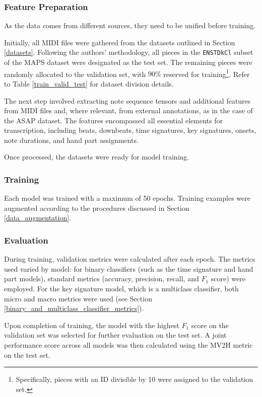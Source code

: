 \subsubsection{Feature Preparation}

As the data comes from different sources, they need to be unified before training.

Initially, all MIDI files were gathered from the datasets outlined in Section \ref{datasets}. Following the authors' methodology, all pieces in the \texttt{ENSTDkCl} subset of the MAPS dataset were designated as the test set. The remaining pieces were randomly allocated to the validation set, with $90\%$ reserved for training\footnote{Specifically, pieces with an ID divisible by 10 were assigned to the validation set.}. Refer to Table \ref{train_valid_test} for dataset division details.

The next step involved extracting note sequence tensors and additional features from MIDI files and, where relevant, from external annotations, as in the case of the ASAP dataset. The features encompassed all essential elements for transcription, including beats, downbeats, time signatures, key signatures, onsets, note durations, and hand part assignments.

Once processed, the datasets were ready for model training.

\subsubsection{Training}

Each model was trained with a maximum of 50 epochs. Training examples were augmented according to the procedures discussed in Section \ref{data_augmentation}.

\subsubsection{Evaluation}

During training, validation metrics were calculated after each epoch. The metrics used varied by model: for binary classifiers (such as the time signature and hand part models), standard metrics (accuracy, precision, recall, and $F_1$ score) were employed. For the key signature model, which is a multiclass classifier, both micro and macro metrics were used (see Section \ref{binary_and_multiclass_classifier_metrics}).

Upon completion of training, the model with the highest $F_1$ score on the validation set was selected for further evaluation on the test set. A joint performance score across all models was then calculated using the MV2H metric on the test set.

